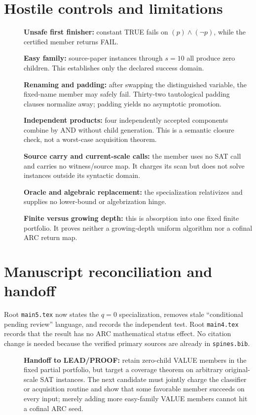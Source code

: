 \documentclass[11pt]{article}
\begin{document}
\section{Hostile controls and limitations}
\begin{description}
\item[] \textbf{Unsafe first finisher:} constant TRUE fails on
$(p)\wedge(\neg p)$, while the certified member returns FAIL.
\item[] \textbf{Easy family:} source-paper instances through $s=10$ all
produce zero children.  This establishes only the declared success domain.
\item[] \textbf{Renaming and padding:} after swapping the distinguished
variable, the fixed-name member may safely fail.  Thirty-two tautological
padding clauses normalize away; padding yields no asymptotic promotion.
\item[] \textbf{Independent products:} four independently accepted
components combine by AND without child generation.  This is a semantic
closure check, not a worst-case acquisition theorem.
\item[] \textbf{Source carry and current-scale calls:} the member uses no SAT
call and carries no witness/source map.  It charges its scan but does not
solve instances outside its syntactic domain.
\item[] \textbf{Oracle and algebraic replacement:} the specialization
relativizes and supplies no lower-bound or algebrization hinge.
\item[] \textbf{Finite versus growing depth:} this is absorption into one
fixed finite portfolio.  It proves neither a growing-depth uniform algorithm
nor a cofinal ARC return map.
\end{description}

\section{Manuscript reconciliation and handoff}
Root \texttt{main5.tex} now states the $q=0$ specialization, removes stale
``conditional pending review'' language, and records the independent test.
Root \texttt{main4.tex} records that the result has no ARC mathematical
status effect.  No citation change is needed because the verified primary
sources are already in \texttt{spines.bib}.

\begin{description}
\item[] \textbf{Handoff to LEAD/PROOF:} retain zero-child VALUE members in the
fixed partial portfolio, but target a coverage theorem on arbitrary original-
scale SAT instances.  The next candidate must jointly charge the classifier
or acquisition routine and show that some favorable member succeeds on every
input; merely adding more easy-family VALUE members cannot hit a cofinal ARC
seed.
\end{description}



\end{document}
